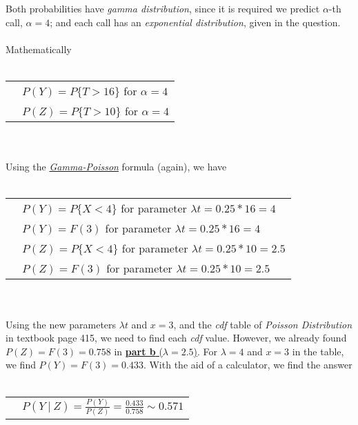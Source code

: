 \documentclass[12pt]{article}
\begin{document}
Both probabilities have \textit{gamma distribution}, since it is 
required we predict $\alpha$-th call, $\alpha = 4$; and 
each call has an \textit{exponential distribution}, given in the question.
\\ \\
Mathematically
\\ \\
\begin{tabular}{l l}
    &$P(Y)=P\{T>16\}$ for $\alpha = 4$\\
    &$P(Z)=P\{T>10\}$ for $\alpha = 4$\\
\end{tabular}
\\ \\
Using the \hyperlink{g-p}{\textit{Gamma-Poisson}} formula (again), we have
\\ \\
\begin{tabular}{l l}
    &$P(Y)=P\{X<4\}$ for parameter $\lambda t = 0.25*16=4$\\
    &$P(Y)=F(3)$ for parameter $\lambda t = 0.25*16=4$\\
    &$P(Z)=P\{X<4\}$ for parameter $\lambda t = 0.25*10=2.5$\\
    &$P(Z)=F(3)$ for parameter $\lambda t = 0.25*10=2.5$\\
\end{tabular}
\\ \\
Using the new parameters $\lambda t$ and $x=3$, and the 
\textit{cdf} table of \textit{Poisson Distribution} in textbook page 415, 
we need to find each \textit{cdf} value. However, we already found
$P(Z)=F(3)=0.758$ in \hyperlink{lambdab}{\textbf{part b} ($\lambda = 2.5$)}. For
$\lambda = 4$ and $x=3$ in the table, we find $P(Y)=F(3)=0.433$.
With the aid of a calculator, we find the answer
\\ \\
\begin{tabular}{l l}
    &$P(Y\ |\ Z)=\frac{P(Y)}{P(Z)}=\frac{0.433}{0.758} \sim 0.571$\\
\end{tabular}
\\ \\
\end{document}
